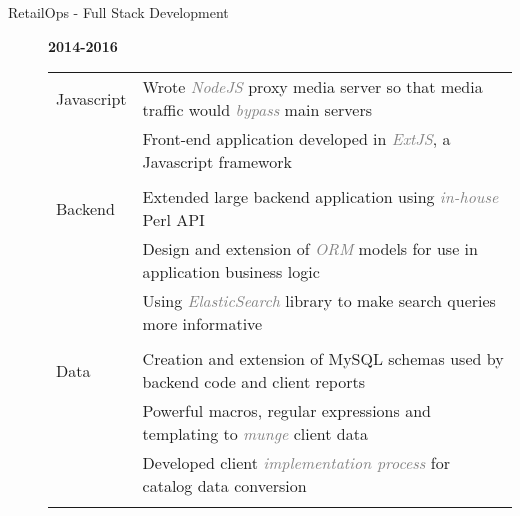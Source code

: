 \documentclass[12pt]{article}
\begin{document}
\begin{description}
\begin{description}
                \item[RetailOps - Full Stack Development] \hfill \textbf{2014-2016}\\
                    \begin{tabular}{l|l}
				\\[-1.0mm]
                        Javascript & Wrote \textcolor{gray}{\textit{NodeJS}} proxy media server so that media traffic would \textcolor{gray}{\textit{bypass}} main servers \\
				   & Front-end application developed in \textcolor{gray}{\textit{ExtJS}}, a Javascript framework\\
				\\[-1.7mm]
                        Backend    & Extended large backend application using \textcolor{gray}{\textit{in-house}} Perl API \\
                                   & Design and extension of \textcolor{gray}{\textit{ORM}} models for use in application business logic \\
                                   & Using \textcolor{gray}{\textit{ElasticSearch}} library to make search queries more informative\\
				\\[-1.7mm]
                        Data       & Creation and extension of MySQL schemas used by backend code and client reports\\
				   & Powerful macros, regular expressions and templating to \textcolor{gray}{\textit{munge}} client data\\
				   & Developed client \textcolor{gray}{\textit{implementation process}} for catalog data conversion\\
				\\[-1.0mm]
                    \end{tabular}
            \end{description}


\end{description}
\end{document}
